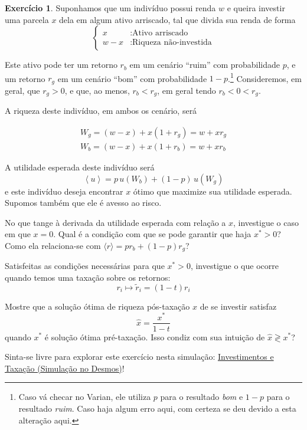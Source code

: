 \documentclass[12pt]{article}
\numberwithin{equation}{section}
\theoremstyle{plain}
\theoremstyle{definition}
\newtheorem{exercise}{Exercício}[section]
\theoremstyle{remark}
\begin{document}
\begin{exercise}
\parencite[, pp. 233-5]{Varian2014} Suponhamos que um indivíduo possui
renda \(w\) e queira investir uma parcela \(x\) dela em algum ativo
arriscado, tal que divida sua renda de forma
\[
\begin{cases}
x&: \text{Ativo arriscado}\\
w-x&: \text{Riqueza não-investida} 
\end{cases}
\]

Este ativo pode ter um retorno \(r_{b}\) em um cenário ``ruim'' com
probabilidade \(p\), e um retorno \(r_{g}\) em um cenário ``bom'' com
probabilidade \(1-p\).\footnote{Caso vá checar no Varian, ele utiliza
  \(p\) para o resultado \textit{bom} e \(1-p\) para o resultado
  \textit{ruim}. Caso haja algum erro aqui, com certeza se deu devido a
  esta alteração aqui.} Consideremos, em geral, que \(r_{g}> 0\), e que,
ao menos, \(r_{b}<r_{g}\), em geral tendo \(r_{b}<0 < r_{g}\).

A riqueza deste indivíduo, em ambos os cenário, será

\begin{align*}
W_{g} = (w-x) + x (1+r_{g}) = w + x r_{g}\\
W_{b} = (w-x) + x (1+r_{b}) = w + x r_{b}
\end{align*}

A utilidade esperada deste indivíduo será
\[
\left<u\right> = p \,u(W_{b}) + (1-p) \,u(W_{g})
\]
e este indivíduo deseja encontrar \(x\) ótimo que maximize sua utilidade
esperada. Supomos também que ele é avesso ao risco.

No que tange à derivada da utilidade esperada com relação a \(x\),
investigue o caso em que \(x=0\). Qual é a condição com que se pode
garantir que haja \(x^*>0\)? Como ela relaciona-se com
\(\langle r \rangle = p r_{b}+(1-p)r_{g}\)?

Satisfeitas as condições necessárias para que \(x^*>0\), investigue o
que ocorre quando temos uma taxação sobre os retornos:
\[
r_{i} \mapsto \tilde{r}_{i} = (1-t) r_{i}
\]

Mostre que a solução ótima de riqueza pós-taxação \(\hat{x}\) de se
investir satisfaz
\[
\hat{x} = \frac{x^*}{1-t}
\]
quando \(x^*\) é solução ótima pré-taxação. Isso condiz com sua intuição
de \(\hat{x} \gtrless x^*\)?

Sinta-se livre para explorar este exercício nesta simulação:
\href{https://www.desmos.com/calculator/ppkg28wznf}{Investimentos e
Taxação (Simulação no Desmos)}!
\end{exercise}
\end{document}
